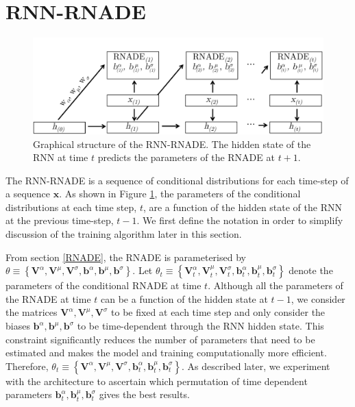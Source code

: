 \documentclass{article} %
\begin{document}
\section{RNN-RNADE}
\label{RNN-RNADE}

\begin{figure}
        \centering
    \includegraphics[scale=0.65]{RNN-RNADE.pdf}
    \caption{Graphical structure of the RNN-RNADE. The hidden state of the RNN at time $t$ predicts the parameters of the RNADE at $t+1$. }
    \label{fig:rnn-rnade}
\end{figure}


The RNN-RNADE is a sequence of conditional distributions for each time-step of a sequence $\mathbf{x}$. As shown in Figure \ref{fig:rnn-rnade}, the parameters of the conditional distributions at each time step, $t$, are a function of the hidden state of the RNN at the previous time-step, $t-1$. We first define the notation in order to simplify discussion of the training algorithm later in this section. 

From section \ref{RNADE}, the RNADE is parameterised by $ \theta \equiv \left\{ \mathbf{V}^{\alpha},\mathbf{V}^{\mu},\mathbf{V}^{\sigma},\mathbf{b}^{\alpha},\mathbf{b}^{\mu},\mathbf{b}^{\sigma} \right\}$. Let  $ \theta_t \equiv \left\{ \mathbf{V}^{\alpha}_{t},\mathbf{V}^{\mu}_{t},\mathbf{V}^{\sigma}_{t},\mathbf{b}^{\alpha}_{t},\mathbf{b}^{\mu}_{t},\mathbf{b}^{\sigma}_{t} \right\}$ denote the parameters of the conditional RNADE at time $t$. Although all the parameters of the RNADE at time $t$ can be a function of the hidden state at $t-1$, we consider the matrices $ \mathbf{V}^{\alpha},\mathbf{V}^{\mu},\mathbf{V}^{\sigma}$ to be fixed at each time step and only consider the biases $\mathbf{b}^{\alpha},\mathbf{b}^{\mu},\mathbf{b}^{\sigma}$ to be time-dependent through the RNN hidden state. This constraint significantly reduces the number of parameters that need to be estimated and makes the model and training computationally more efficient. 
Therefore, $ \theta_t \equiv \left\{ \mathbf{V}^{\alpha},\mathbf{V}^{\mu},\mathbf{V}^{\sigma},\mathbf{b}^{\alpha}_{t},\mathbf{b}^{\mu}_{t},\mathbf{b}^{\sigma}_{t} \right\}$. As described later, we experiment with the architecture to ascertain which permutation of time dependent parameters $\mathbf{b}^{\alpha}_{t},\mathbf{b}^{\mu}_{t},\mathbf{b}^{\sigma}_{t}$ gives the best results.  
\end{document}
